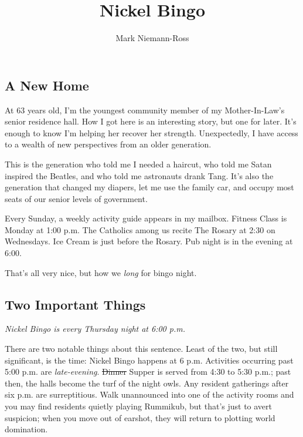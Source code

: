 \documentclass[
  letterpaper,
  DIV=11,
  numbers=noendperiod]{scrartcl}
\title{Nickel Bingo}
\author{Mark Niemann-Ross}
\date{}
\begin{document}
\maketitle
\ifdefined\Shaded\renewenvironment{Shaded}{\begin{tcolorbox}[interior hidden, frame hidden, breakable, borderline west={3pt}{0pt}{shadecolor}, sharp corners, boxrule=0pt, enhanced]}{\end{tcolorbox}}\fi

\hypertarget{a-new-home}{%
\subsection{A New Home}\label{a-new-home}}

At 63 years old, I'm the youngest community member of my Mother-In-Law's
senior residence hall. How I got here is an interesting story, but one
for later. It's enough to know I'm helping her recover her strength.
Unexpectedly, I have access to a wealth of new perspectives from an
older generation.

This is the generation who told me I needed a haircut, who told me Satan
inspired the Beatles, and who told me astronauts drank Tang. It's also
the generation that changed my diapers, let me use the family car, and
occupy most seats of our senior levels of government.

Every Sunday, a weekly activity guide appears in my mailbox. Fitness
Class is Monday at 1:00 p.m. The Catholics among us recite The Rosary at
2:30 on Wednesdays. Ice Cream is just before the Rosary. Pub night is in
the evening at 6:00.

That's all very nice, but how we \emph{long} for bingo night.

\hypertarget{two-important-things}{%
\subsection{Two Important Things}\label{two-important-things}}

\emph{Nickel Bingo is every Thursday night at 6:00 p.m.}

There are two notable things about this sentence. Least of the two, but
still significant, is the time: Nickel Bingo happens at 6 p.m.
Activities occurring past 5:00 p.m. are \emph{late-evening}.
\sout{Dinner} Supper is served from 4:30 to 5:30 p.m.; past then, the
halls become the turf of the night owls. Any resident gatherings after
six p.m. are surreptitious. Walk unannounced into one of the activity
rooms and you may find residents quietly playing Rummikub, but that's
just to avert suspicion; when you move out of earshot, they will return
to plotting world domination.
\end{document}
